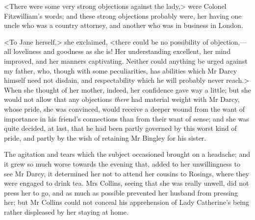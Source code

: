<There were some very strong objections against the lady,> were Colonel Fitzwilliam's words; and these strong objections probably were, her having one uncle who was a country attorney, and another who was in business in London.

<To Jane herself,> she exclaimed, <there could be no possibility of objection,—all loveliness and goodness as she is! Her understanding excellent, her mind improved, and her manners captivating. Neither could anything be urged against my father, who, though with some peculiarities, has abilities which Mr Darcy himself need not disdain, and respectability which he will probably never reach.> When she thought of her mother, indeed, her confidence gave way a little; but she would not allow that any objections \textit{there} had material weight with Mr Darcy, whose pride, she was convinced, would receive a deeper wound from the want of importance in his friend's connections than from their want of sense; and she was quite decided, at last, that he had been partly governed by this worst kind of pride, and partly by the wish of retaining Mr Bingley for his sister.

The agitation and tears which the subject occasioned brought on a headache; and it grew so much worse towards the evening that, added to her unwillingness to see Mr Darcy, it determined her not to attend her cousins to Rosings, where they were engaged to drink tea. Mrs Collins, seeing that she was really unwell, did not press her to go, and as much as possible prevented her husband from pressing her; but Mr Collins could not conceal his apprehension of Lady Catherine's being rather displeased by her staying at home.

